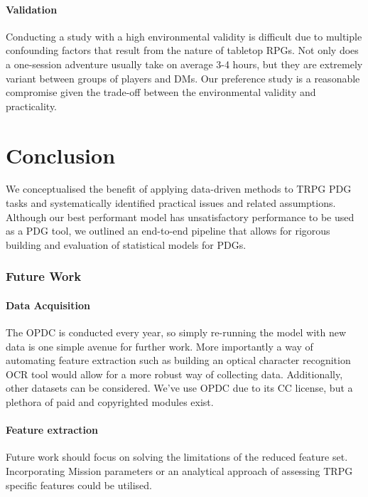\documentclass{UoYCSproject}
\begin{document}
\subsubsection{Validation}
Conducting a study with a high environmental validity is difficult due to multiple confounding factors that result from the nature of tabletop RPGs. Not only does a one-session adventure usually take on average 3-4 hours, but they are extremely variant between groups of players and DMs. Our preference study is a reasonable compromise given the trade-off between the environmental validity and practicality.



\chapter{Conclusion}
\label{cha:conclusion}
We conceptualised the benefit of applying data-driven methods to TRPG PDG tasks and systematically identified practical issues and related assumptions. Although our best performant model has unsatisfactory performance to be used as a PDG tool, we outlined an end-to-end pipeline that allows for rigorous building and evaluation of statistical models for PDGs. 

\subsection{Future Work}

\subsubsection{Data Acquisition}
The OPDC is conducted every year, so simply re-running the model with new data is one simple avenue for further work. More importantly a way of automating feature extraction such as building an optical character recognition OCR tool would allow for a more robust way of collecting data. Additionally, other datasets can be considered. We've use OPDC due to its CC license, but a plethora of paid and copyrighted modules exist.

\subsubsection{Feature extraction}
Future work should focus on solving the limitations of the reduced feature set. Incorporating Mission parameters or an analytical approach of assessing TRPG specific features could be utilised.
\end{document}
